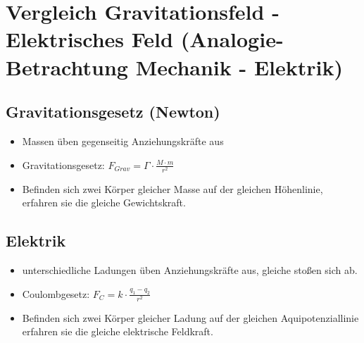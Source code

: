 \documentclass{article}
\begin{document}
\section*{Vergleich Gravitationsfeld - Elektrisches Feld \newline (Analogie-Betrachtung Mechanik - Elektrik)}

\subsection*{Gravitationsgesetz (Newton)}

\begin{itemize}
\item Massen üben gegenseitig Anziehungskräfte aus
\item Gravitationsgesetz: $F_{Grav} = \Gamma \cdot \frac{M \cdot m} {r^2}$
\item Befinden sich zwei Körper gleicher Masse auf der gleichen Höhenlinie, erfahren sie die gleiche Gewichtskraft.
\end{itemize}

\subsection*{Elektrik}

\begin{itemize}
\item unterschiedliche Ladungen üben Anziehungskräfte aus, gleiche stoßen sich ab.
\item Coulombgesetz: $F_C = k \cdot \frac{q_1 - q_2} {r^2}$
\item Befinden sich zwei Körper gleicher Ladung auf der gleichen Aquipotenziallinie erfahren sie die gleiche elektrische Feldkraft.
\end{itemize}
\end{document}
